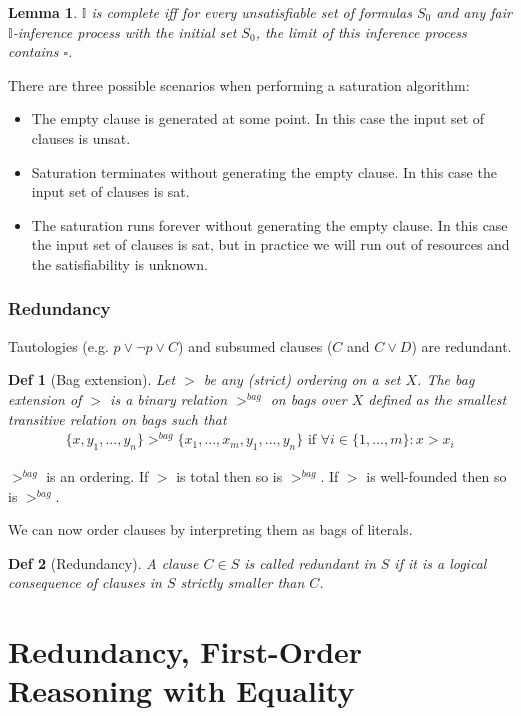 \documentclass[]{article}
\newtheorem{lemma}{Lemma}
\newtheorem*{definition*}{Def}
\begin{document}
\begin{lemma}
	$\mathbb{I}$ is complete iff for every unsatisfiable set of formulas $S_0$ and any fair $\mathbb{I}$-inference process with the initial set $S_0$, the limit of this inference process contains $\square$.
\end{lemma}

There are three possible scenarios when performing a saturation algorithm:
\begin{itemize}
	\item The empty clause is generated at some point. In this case the input set of clauses is unsat.
	\item Saturation terminates without generating the empty clause. In this case the input set of clauses is sat.
	\item The saturation runs forever without generating the empty clause. In this case the input set of clauses is sat, but in practice we will run out of resources and the satisfiability is unknown.
\end{itemize}

\subsubsection{Redundancy}

Tautologies (e.g. $p \lor \lnot p \lor C$) and subsumed clauses ($C$ and $C \lor D$) are redundant.

\begin{definition*}[Bag extension]
	Let $>$ be any (strict) ordering on a set $X$. The bag extension of $>$ is a binary relation $>^{bag}$ on bags over $X$ defined as the smallest transitive relation on bags such that
	\begin{align*}
		\{x,y_1,...,y_n\} >^{bag} \{x_1,...,x_m,y_1,...,y_n\} \text{ if } \forall i\in\{1,...,m\}: x>x_i
	\end{align*}
\end{definition*}

$>^{bag}$ is an ordering. If $>$ is total then so is $>^{bag}$. If $>$ is well-founded then so is $>^{bag}$.

We can now order clauses by interpreting them as bags of literals.

\begin{definition*}[Redundancy]
	A clause $C \in S$ is called redundant in $S$ if it is a logical consequence of clauses in $S$ strictly smaller than $C$.
\end{definition*}

\section{Redundancy, First-Order Reasoning with Equality}
\end{document}
